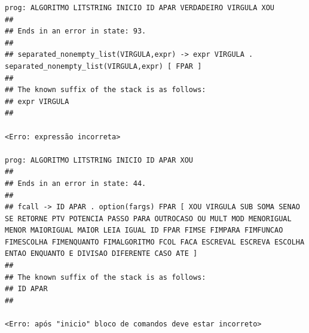 \documentclass[hidelinks,12pt]{article}
\begin{document}
\begin{lstlisting}
prog: ALGORITMO LITSTRING INICIO ID APAR VERDADEIRO VIRGULA XOU 
##
## Ends in an error in state: 93.
##
## separated_nonempty_list(VIRGULA,expr) -> expr VIRGULA . separated_nonempty_list(VIRGULA,expr) [ FPAR ]
##
## The known suffix of the stack is as follows:
## expr VIRGULA 
##

<Erro: expressão incorreta>

prog: ALGORITMO LITSTRING INICIO ID APAR XOU 
##
## Ends in an error in state: 44.
##
## fcall -> ID APAR . option(fargs) FPAR [ XOU VIRGULA SUB SOMA SENAO SE RETORNE PTV POTENCIA PASSO PARA OUTROCASO OU MULT MOD MENORIGUAL MENOR MAIORIGUAL MAIOR LEIA IGUAL ID FPAR FIMSE FIMPARA FIMFUNCAO FIMESCOLHA FIMENQUANTO FIMALGORITMO FCOL FACA ESCREVAL ESCREVA ESCOLHA ENTAO ENQUANTO E DIVISAO DIFERENTE CASO ATE ]
##
## The known suffix of the stack is as follows:
## ID APAR 
##

<Erro: após "inicio" bloco de comandos deve estar incorreto>


\end{lstlisting}
\end{document}
